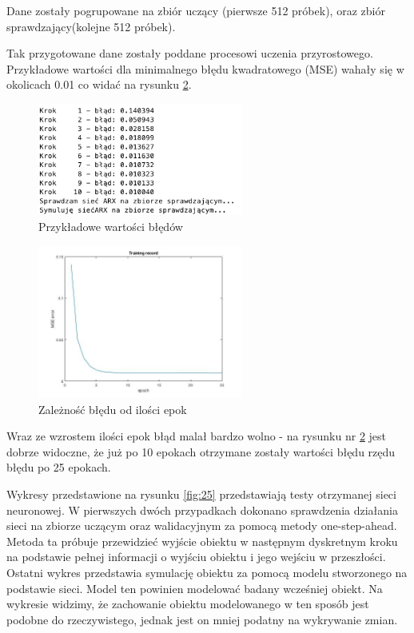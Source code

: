 \documentclass{article}
\begin{document}
Dane zostały pogrupowane na zbiór uczący (pierwsze 512 próbek), oraz
zbiór sprawdzający(kolejne 512 próbek).

Tak przygotowane dane zostały poddane procesowi uczenia przyrostowego.
Przykładowe wartości dla minimalnego błędu kwadratowego (MSE) wahały się w okolicach
0.01 co widać na rysunku \ref{fig:25_epoches}.

\begin{figure}[H]
\centering
\includegraphics[width=0.60\textwidth]{errors.png}
\caption{Przykładowe wartości błędów}
	\label{fig:error}
\end{figure}

\begin{figure}[H]
\centering
\includegraphics[width=0.60\textwidth]{25_epoches.jpg}
\caption{Zależność błędu od ilości epok}
	\label{fig:25_epoches}
\end{figure}

%
Wraz ze wzrostem ilości epok błąd malał bardzo wolno - na rysunku nr \ref{fig:25_epoches}
jest dobrze widoczne, że  już po 10 epokach otrzymane zostały wartości błędu rzędu błędu po 25 epokach.

Wykresy przedstawione na rysunku \ref{fig:25} przedstawiają testy otrzymanej sieci neuronowej.
W pierwszych dwóch przypadkach dokonano sprawdzenia działania sieci na zbiorze uczącym oraz walidacyjnym
za pomocą metody one-step-ahead. Metoda ta próbuje przewidzieć wyjście obiektu w następnym dyskretnym kroku
na podstawie pełnej informacji o wyjściu obiektu i jego wejściu w przeszłości. Ostatni wykres przedstawia
symulację obiektu za pomocą modelu stworzonego na podstawie sieci. Model ten
powinien modelować badany wcześniej obiekt. Na wykresie widzimy, że zachowanie obiektu modelowanego
w ten sposób jest podobne do rzeczywistego, jednak jest on mniej podatny na wykrywanie zmian.
\end{document}

